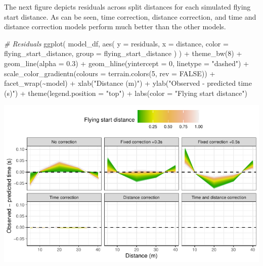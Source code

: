 \documentclass[fleqn,10pt]{wlpeerj} %
\newenvironment{Shaded}{\begin{snugshade}}{\end{snugshade}}
\newcommand{\AttributeTok}[1]{\textcolor[rgb]{0.77,0.63,0.00}{#1}}
\newcommand{\CommentTok}[1]{\textcolor[rgb]{0.56,0.35,0.01}{\textit{#1}}}
\newcommand{\ConstantTok}[1]{\textcolor[rgb]{0.00,0.00,0.00}{#1}}
\newcommand{\DecValTok}[1]{\textcolor[rgb]{0.00,0.00,0.81}{#1}}
\newcommand{\FloatTok}[1]{\textcolor[rgb]{0.00,0.00,0.81}{#1}}
\newcommand{\FunctionTok}[1]{\textcolor[rgb]{0.00,0.00,0.00}{#1}}
\newcommand{\NormalTok}[1]{#1}
\newcommand{\SpecialCharTok}[1]{\textcolor[rgb]{0.00,0.00,0.00}{#1}}
\newcommand{\StringTok}[1]{\textcolor[rgb]{0.31,0.60,0.02}{#1}}
\begin{document}
The next figure depicts residuals across split distances for each simulated flying start distance. As can be seen, time correction, distance correction, and time and distance correction models perform much better than the other models.

\small

\begin{Shaded}
\begin{Highlighting}[]
\CommentTok{\# Residuals}
\FunctionTok{ggplot}\NormalTok{(}
\NormalTok{  model\_df,}
  \FunctionTok{aes}\NormalTok{(}
    \AttributeTok{y =}\NormalTok{ residuals,}
    \AttributeTok{x =}\NormalTok{ distance,}
    \AttributeTok{color =}\NormalTok{ flying\_start\_distance,}
    \AttributeTok{group =}\NormalTok{ flying\_start\_distance}
\NormalTok{  )}
\NormalTok{) }\SpecialCharTok{+}
  \FunctionTok{theme\_bw}\NormalTok{(}\DecValTok{8}\NormalTok{) }\SpecialCharTok{+}
  \FunctionTok{geom\_line}\NormalTok{(}\AttributeTok{alpha =} \FloatTok{0.3}\NormalTok{) }\SpecialCharTok{+}
  \FunctionTok{geom\_hline}\NormalTok{(}\AttributeTok{yintercept =} \DecValTok{0}\NormalTok{, }\AttributeTok{linetype =} \StringTok{"dashed"}\NormalTok{) }\SpecialCharTok{+}
  \FunctionTok{scale\_color\_gradientn}\NormalTok{(}\AttributeTok{colours =} \FunctionTok{terrain.colors}\NormalTok{(}\DecValTok{5}\NormalTok{, }\AttributeTok{rev =} \ConstantTok{FALSE}\NormalTok{)) }\SpecialCharTok{+}
  \FunctionTok{facet\_wrap}\NormalTok{(}\SpecialCharTok{\textasciitilde{}}\NormalTok{model) }\SpecialCharTok{+}
  \FunctionTok{xlab}\NormalTok{(}\StringTok{"Distance (m)"}\NormalTok{) }\SpecialCharTok{+}
  \FunctionTok{ylab}\NormalTok{(}\StringTok{"Observed {-} predicted time (s)"}\NormalTok{) }\SpecialCharTok{+}
  \FunctionTok{theme}\NormalTok{(}\AttributeTok{legend.position =} \StringTok{"top"}\NormalTok{) }\SpecialCharTok{+}
  \FunctionTok{labs}\NormalTok{(}\AttributeTok{color =} \StringTok{"Flying start distance"}\NormalTok{)}
\end{Highlighting}
\end{Shaded}

\begin{center}\includegraphics[width=0.9\linewidth]{paper_files/figure-latex/unnamed-chunk-39-1} \end{center}
\end{document}
